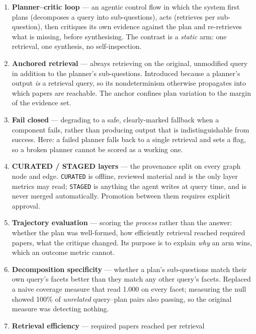 \begin{enumerate}[label=\arabic*.]
  \item \textbf{Planner--critic loop} --- an agentic control flow in which the
        system first plans (decomposes a query into sub-questions), acts
        (retrieves per sub-question), then critiques its own evidence against
        the plan and re-retrieves what is missing, before synthesising. The
        contrast is a \emph{static} arm: one retrieval, one synthesis, no
        self-inspection.
  \item \textbf{Anchored retrieval} --- always retrieving on the original,
        unmodified query in addition to the planner's sub-questions. Introduced
        because a planner's output \emph{is} a retrieval query, so its
        nondeterminism otherwise propagates into which papers are reachable.
        The anchor confines plan variation to the margin of the evidence set.
  \item \textbf{Fail closed} --- degrading to a safe, clearly-marked fallback
        when a component fails, rather than producing output that is
        indistinguishable from success. Here: a failed planner falls back to a
        single retrieval and sets a flag, so a broken planner cannot be scored
        as a working one.
  \item \textbf{CURATED / STAGED layers} --- the provenance split on every
        graph node and edge. \texttt{CURATED} is offline, reviewed material and
        is the only layer metrics may read; \texttt{STAGED} is anything the
        agent writes at query time, and is never merged automatically.
        Promotion between them requires explicit approval.
  \item \textbf{Trajectory evaluation} --- scoring the \emph{process} rather
        than the answer: whether the plan was well-formed, how efficiently
        retrieval reached required papers, what the critique changed. Its
        purpose is to explain \emph{why} an arm wins, which an outcome metric
        cannot.
  \item \textbf{Decomposition specificity} --- whether a plan's sub-questions
        match their own query's facets better than they match any other query's
        facets. Replaced a naive coverage measure that read 1.000 on every
        facet; measuring the null showed 100\% of \emph{unrelated} query--plan
        pairs also passing, so the original measure was detecting nothing.
  \item \textbf{Retrieval efficiency} --- required papers reached per retrieval

\end{enumerate}
